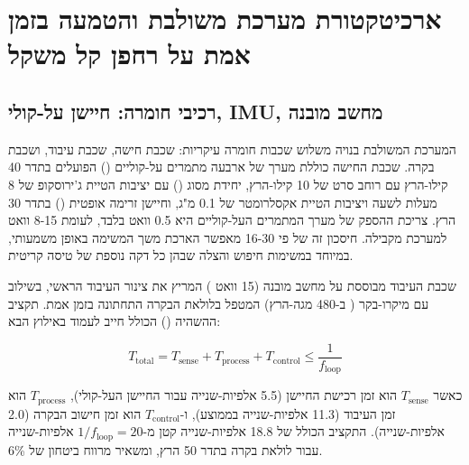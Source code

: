 

\section{ארכיטקטורת מערכת משולבת והטמעה בזמן אמת על רחפן קל משקל}
\label{sec:ch07_system_architecture}

\subsection{רכיבי חומרה: חיישן על-קולי, IMU, מחשב מובנה}
\label{sec:ch07_hardware}

המערכת המשולבת בנויה משלוש שכבות חומרה עיקריות: שכבת חישה, שכבת עיבוד, ושכבת בקרה. שכבת החישה כוללת מערך של ארבעה מתמרים על-קוליים () הפועלים בתדר 40 קילו-הרץ עם רוחב סרט של 10 קילו-הרץ, יחידת  מסוג  () עם יציבות הטיית ג'ירוסקופ של 8 מעלות לשעה ויציבות הטיית אקסלרומטר של 0.1 מ"ג, וחיישן זרימה אופטית () בתדר 30 הרץ. צריכת ההספק של מערך המתמרים העל-קוליים היא 0.5 וואט בלבד, לעומת 8-15 וואט למערכת  מקבילה. חיסכון זה של פי 16-30 מאפשר הארכת משך המשימה באופן משמעותי, במיוחד במשימות חיפוש והצלה שבהן כל דקה נוספת של טיסה קריטית. \cite{CrewAIDocs}

שכבת העיבוד מבוססת על מחשב מובנה  (15 וואט ) המריץ את צינור העיבוד הראשי, בשילוב עם מיקרו-בקר  ( ב-480 מגה-הרץ) המטפל בלולאת הבקרה התחתונה בזמן אמת. תקציב ההשהיה () הכולל חייב לעמוד באילוץ הבא:

\begin{equation}
T_{\text{total}} = T_{\text{sense}} + T_{\text{process}} + T_{\text{control}} \leq \frac{1}{f_{\text{loop}}}
\label{eq:ch07_latency_budget}
\end{equation}

כאשר $T_{\text{sense}}$ הוא זמן רכישת החיישן (5.5 אלפיות-שנייה עבור החיישן העל-קולי), $T_{\text{process}}$ הוא זמן העיבוד (11.3 אלפיות-שנייה בממוצע), ו-$T_{\text{control}}$ הוא זמן חישוב הבקרה (2.0 אלפיות-שנייה). התקציב הכולל של 18.8 אלפיות-שנייה קטן מ-$1/f_{\text{loop}} = 20$ אלפיות-שנייה עבור לולאת בקרה בתדר 50 הרץ, ומשאיר מרווח ביטחון של 6\%.

